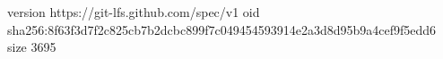 version https://git-lfs.github.com/spec/v1
oid sha256:8f63f3d7f2c825cb7b2dcbc899f7c049454593914e2a3d8d95b9a4cef9f5edd6
size 3695
